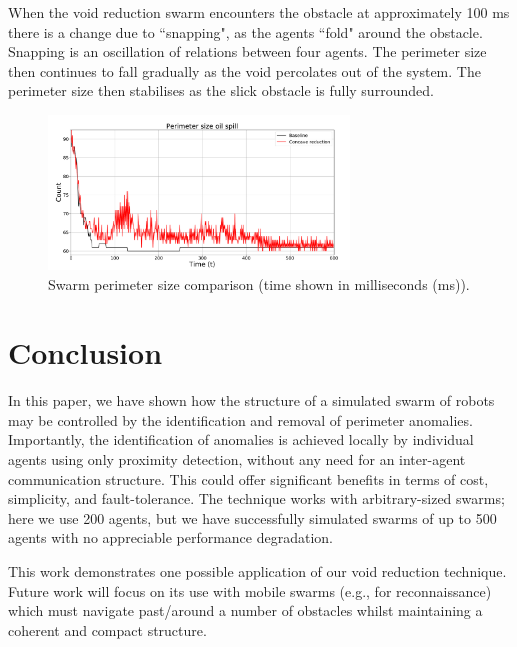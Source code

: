 \documentclass[letterpaper]{article}
\begin{document}
When the void reduction swarm encounters the obstacle at approximately 100 ms there is a change due to ``snapping", as the agents ``fold" around the obstacle. Snapping is an oscillation of relations between four agents. The perimeter size then continues to fall gradually as the void percolates out of the system. The perimeter size then stabilises as the slick obstacle is fully surrounded.

 \begin{figure}
 \begin{center}
 \includegraphics[width=8cm]{figures/OilSpillPerimeter8060-1}
 \end{center}
 \caption{Swarm perimeter size comparison (time shown in milliseconds (ms)). \label{concave:OilSpillPerimeter8060-1}}
 \end{figure}

\section{Conclusion}
\label{voids:Conclusion}

In this paper, we have shown how the structure of a simulated swarm of robots may be controlled by the identification and removal of perimeter anomalies. Importantly, the identification of anomalies is achieved locally by individual agents using only proximity detection, without any need for an inter-agent communication structure. This could offer significant benefits in terms of cost, simplicity, and fault-tolerance. The technique works with arbitrary-sized swarms; here we use 200 agents, but we have successfully simulated swarms of up to 500 agents with no appreciable performance degradation.

This work demonstrates one possible application of our void reduction technique. Future work will focus on its use with mobile swarms (e.g., for reconnaissance) which must navigate past/around a number of obstacles whilst maintaining a coherent and compact structure.


\footnotesize


\end{document}
